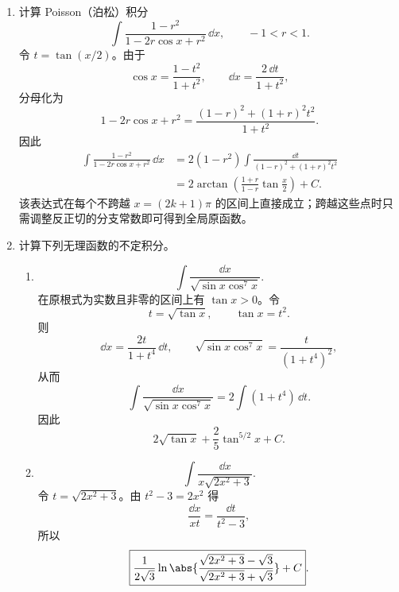 \begin{enumerate}
\begin{enumerate}[label=(\arabic*)]
    \item
    \[
      \int\frac{\sin x\cos x}{1+\sin^4x}\,\dd x.
    \]
    令 $u=\sin^2x$，则 $\dd u=2\sin x\cos x\,\dd x$，故
    \[
      \boxed{\frac12\arctan(\sin^2x)+C}.
    \]

    \item
    \[
      \int\frac{\dd x}{\sin^4x\cos^2x}.
    \]
    令 $t=\cot x$，则 $\dd x=-\dd t/(1+t^2)$，并有
    \[
      \frac{\dd x}{\sin^4x\cos^2x}
      =-\left(t^{-2}+2+t^2\right)\dd t.
    \]
    因此
    \[
      \boxed{\tan x-2\cot x-\frac13\cot^3x+C}.
    \]
  \end{enumerate}

  \item 计算 Poisson（泊松）积分
  \[
    \int\frac{1-r^2}{1-2r\cos x+r^2}\,\dd x,
    \qquad -1<r<1.
  \]
  令 $t=\tan(x/2)$。由于
  \[
    \cos x=\frac{1-t^2}{1+t^2},
    \qquad
    \dd x=\frac{2\,\dd t}{1+t^2},
  \]
  分母化为
  \[
    1-2r\cos x+r^2
    =\frac{(1-r)^2+(1+r)^2t^2}{1+t^2}.
  \]
  因此
  \begin{align*}
    \int\frac{1-r^2}{1-2r\cos x+r^2}\,\dd x
    &=2(1-r^2)\int
      \frac{\dd t}{(1-r)^2+(1+r)^2t^2}\\
    &=\boxed{2\arctan\left(
      \frac{1+r}{1-r}\tan\frac x2
      \right)+C}.
  \end{align*}
  该表达式在每个不跨越 $x=(2k+1)\pi$ 的区间上直接成立；跨越这些点时只需调整反正切的分支常数即可得到全局原函数。

  \item 计算下列无理函数的不定积分。
  \begin{enumerate}[label=(\arabic*)]
    \item
    \[
      \int\frac{\dd x}{\sqrt{\sin x\cos^7x}}.
    \]
    在原根式为实数且非零的区间上有 $\tan x>0$。令
    \[
      t=\sqrt{\tan x},
      \qquad \tan x=t^2.
    \]
    则
    \[
      \dd x=\frac{2t}{1+t^4}\,\dd t,
      \qquad
      \sqrt{\sin x\cos^7x}=\frac{t}{(1+t^4)^2},
    \]
    从而
    \[
      \int\frac{\dd x}{\sqrt{\sin x\cos^7x}}
      =2\int(1+t^4)\,\dd t.
    \]
    因此
    \[
      \boxed{2\sqrt{\tan x}+\frac25\tan^{5/2}x+C}.
    \]

    \item
    \[
      \int\frac{\dd x}{x\sqrt{2x^2+3}}.
    \]
    令 $t=\sqrt{2x^2+3}$。由 $t^2-3=2x^2$ 得
    \[
      \frac{\dd x}{x t}=\frac{\dd t}{t^2-3},
    \]
    所以
    \[
      \boxed{
      \frac1{2\sqrt3}\ln\abs{
        \frac{\sqrt{2x^2+3}-\sqrt3}{\sqrt{2x^2+3}+\sqrt3}}
      +C}.
    \]


\end{enumerate}
\end{enumerate}
